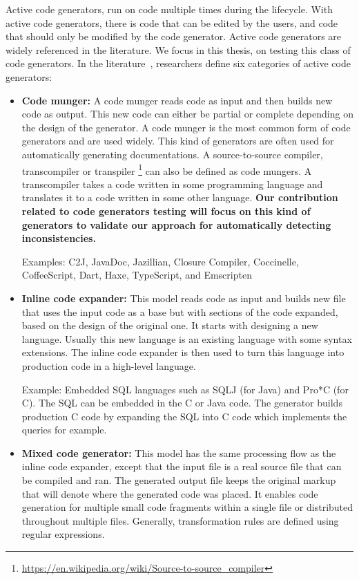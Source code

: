 Active code generators, run on code multiple times during the lifecycle. With active code generators, there is code that can be edited by the users, and code that should only be modified by the code generator. Active code generators are widely referenced in the literature\cite{pais2005tool,amanquah2009rapid}. We focus in this thesis, on testing this class of code generators.
In the literature~\cite{herrington2003code,hunt2000pragmatic,fertalj2008source,bajovs2013code}, researchers define six categories of active code generators: 

\begin{itemize}
\item \textbf{Code munger:} A code munger reads code as input and then builds new code as output. This new code can either be partial or complete depending on the design of the generator.
A code munger is the most common form of code generators and are used widely. This kind of generators are often used for automatically generating documentations.
A source-to-source compiler, transcompiler or transpiler \footnote{\url{https://en.wikipedia.org/wiki/Source-to-source_compiler}} can also be defined as code mungers. A transcompiler takes a code written in some programming language and translates it to a code written in some other language. \textbf{Our contribution related to code generators testing will focus on this kind of generators to validate our approach for automatically detecting inconsistencies.}

Examples:  C2J, JavaDoc, Jazillian, Closure Compiler, Coccinelle, CoffeeScript, Dart, Haxe, TypeScript, and Emscripten



\item \textbf{Inline code expander:} This model reads code as input and builds new file that uses the input code as a base but with sections of the code expanded, based on the design of the original one. 
It starts with designing a new language. Usually this new language is an existing language with some syntax extensions. The inline code expander is then used to turn this language into production code in a high-level language.

Example: Embedded SQL languages such as SQLJ (for Java) and Pro*C (for C). The SQL can be embedded in the C or Java code. The generator builds production C code by expanding the SQL into C code which implements the queries for example.

\item \textbf{Mixed code generator:} This model has the same processing flow as the inline code expander, except that the input file is a real source file that can be compiled and ran. The generated output file keeps the original markup that will denote where the generated code was placed. It enables code generation for multiple small code fragments within a single file or distributed throughout multiple files. Generally, transformation rules are defined using regular expressions.



\end{itemize}
